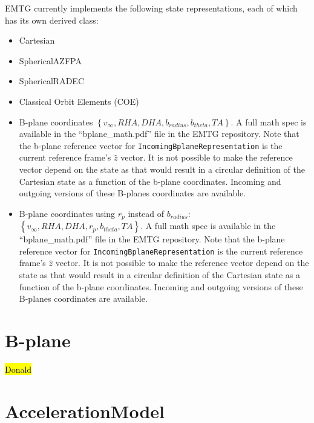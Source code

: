 EMTG currently implements the following state representations, each of which has its own derived class:
\begin{itemize}
	\item Cartesian
	\item SphericalAZFPA
	\item SphericalRADEC
	\item Classical Orbit Elements (COE)
	\item B-plane coordinates $\left\{v_\infty, RHA, DHA, b_{radius}, b_{theta}, TA\right\}$. A full math spec is available in the ``bplane\_math.pdf'' file in the EMTG repository. Note that the b-plane reference vector for \texttt{IncomingBplaneRepresentation} is the current reference frame's $\hat z$ vector. It is not possible to make the reference vector depend on the state as that would result in a circular definition of the Cartesian state as a function of the b-plane coordinates. Incoming and outgoing versions of these B-planes coordinates are available.
	\item B-plane coordinates using $r_p$ instead of $b_{radius}$: $\left\{v_\infty, RHA, DHA, r_p, b_{theta}, TA\right\}$. A full math spec is available in the ``bplane\_math.pdf'' file in the EMTG repository. Note that the b-plane reference vector for \texttt{IncomingBplaneRepresentation} is the current reference frame's $\hat z$ vector. It is not possible to make the reference vector depend on the state as that would result in a circular definition of the Cartesian state as a function of the b-plane coordinates. Incoming and outgoing versions of these B-planes coordinates are available.
\end{itemize}

\section{B-plane}
\label{sec:bplane}

\hl{Donald}

\section{AccelerationModel}
\label{sec:acceleration_model}

